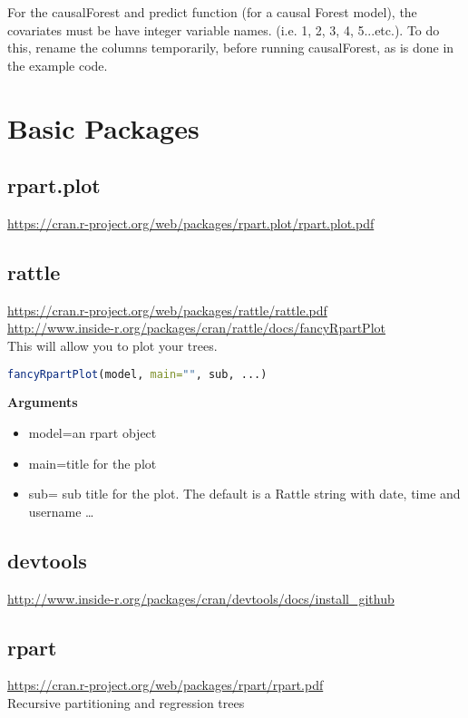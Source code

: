 \documentclass{article}
\begin{document}
For the causalForest and predict function (for a causal Forest model), the covariates must be have integer variable names.  (i.e. 1, 2, 3, 4, 5...etc.). To do this, rename the columns temporarily, before running causalForest, as is done in the example code.  \\

\section{Basic Packages}
\subsection{rpart.plot } \url{https://cran.r-project.org/web/packages/rpart.plot/rpart.plot.pdf}
\subsection{rattle} 
 	\url{https://cran.r-project.org/web/packages/rattle/rattle.pdf} \\
 	\url{http://www.inside-r.org/packages/cran/rattle/docs/fancyRpartPlot} \\
	This will allow you to plot your trees. 
\begin{lstlisting}[language=R]
fancyRpartPlot(model, main="", sub, ...)
\end{lstlisting}

\textbf{Arguments} \\
\begin{itemize}
  \item model=an rpart object
  \item main=title for the plot
  \item sub= sub title for the plot. The default is a Rattle string with date, time and username \ldots
\end{itemize}


\subsection{devtools}
 	\url{http://www.inside-r.org/packages/cran/devtools/docs/install_github} \\

\subsection{rpart} 
 	\url{https://cran.r-project.org/web/packages/rpart/rpart.pdf} \\
	Recursive partitioning and regression trees	
\end{document}

